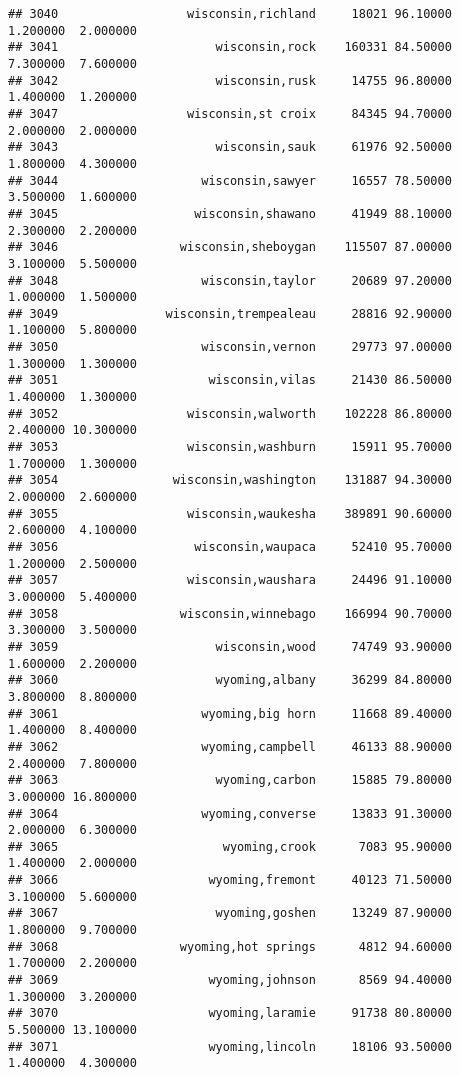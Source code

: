 \documentclass[
]{article}
\begin{document}
\begin{verbatim}
## 3040                  wisconsin,richland     18021 96.10000  1.200000  2.000000
## 3041                      wisconsin,rock    160331 84.50000  7.300000  7.600000
## 3042                      wisconsin,rusk     14755 96.80000  1.400000  1.200000
## 3047                  wisconsin,st croix     84345 94.70000  2.000000  2.000000
## 3043                      wisconsin,sauk     61976 92.50000  1.800000  4.300000
## 3044                    wisconsin,sawyer     16557 78.50000  3.500000  1.600000
## 3045                   wisconsin,shawano     41949 88.10000  2.300000  2.200000
## 3046                 wisconsin,sheboygan    115507 87.00000  3.100000  5.500000
## 3048                    wisconsin,taylor     20689 97.20000  1.000000  1.500000
## 3049               wisconsin,trempealeau     28816 92.90000  1.100000  5.800000
## 3050                    wisconsin,vernon     29773 97.00000  1.300000  1.300000
## 3051                     wisconsin,vilas     21430 86.50000  1.400000  1.300000
## 3052                  wisconsin,walworth    102228 86.80000  2.400000 10.300000
## 3053                  wisconsin,washburn     15911 95.70000  1.700000  1.300000
## 3054                wisconsin,washington    131887 94.30000  2.000000  2.600000
## 3055                  wisconsin,waukesha    389891 90.60000  2.600000  4.100000
## 3056                   wisconsin,waupaca     52410 95.70000  1.200000  2.500000
## 3057                  wisconsin,waushara     24496 91.10000  3.000000  5.400000
## 3058                 wisconsin,winnebago    166994 90.70000  3.300000  3.500000
## 3059                      wisconsin,wood     74749 93.90000  1.600000  2.200000
## 3060                      wyoming,albany     36299 84.80000  3.800000  8.800000
## 3061                    wyoming,big horn     11668 89.40000  1.400000  8.400000
## 3062                    wyoming,campbell     46133 88.90000  2.400000  7.800000
## 3063                      wyoming,carbon     15885 79.80000  3.000000 16.800000
## 3064                    wyoming,converse     13833 91.30000  2.000000  6.300000
## 3065                       wyoming,crook      7083 95.90000  1.400000  2.000000
## 3066                     wyoming,fremont     40123 71.50000  3.100000  5.600000
## 3067                      wyoming,goshen     13249 87.90000  1.800000  9.700000
## 3068                 wyoming,hot springs      4812 94.60000  1.700000  2.200000
## 3069                     wyoming,johnson      8569 94.40000  1.300000  3.200000
## 3070                     wyoming,laramie     91738 80.80000  5.500000 13.100000
## 3071                     wyoming,lincoln     18106 93.50000  1.400000  4.300000

\end{verbatim}
\end{document}
